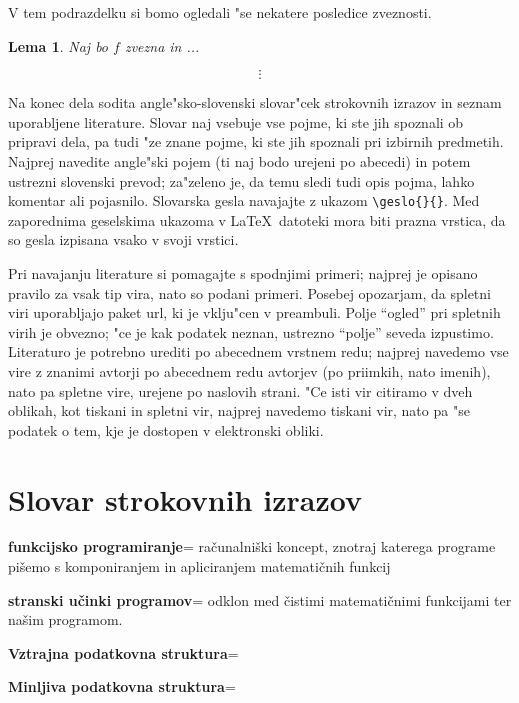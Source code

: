 \documentclass[12pt,a4paper]{amsart}
\theoremstyle{definition} %
\theoremstyle{plain} %
\newtheorem{lema}[definicija]{Lema}
\newcommand{\geslo}[2]{\noindent\textbf{#1}\hspace*{3mm}\hangindent=\parindent\hangafter=1 #2}
\begin{document}
V tem podrazdelku si bomo ogledali "se nekatere posledice zveznosti. 

\begin{lema}
Naj bo $f$ zvezna in ...
\end{lema}

$$\vdots$$

Na konec dela sodita angle"sko-slovenski slovar"cek strokovnih izrazov in seznam uporabljene literature. Slovar naj vsebuje vse pojme, ki ste jih spoznali ob pripravi dela, pa tudi "ze znane pojme, ki ste jih spoznali pri izbirnih predmetih. Najprej navedite angle"ski pojem (ti naj bodo urejeni po abecedi) in potem ustrezni slovenski prevod; za"zeleno je, da temu sledi tudi opis pojma, lahko komentar ali pojasnilo. Slovarska gesla navajajte z ukazom \verb|\geslo{}{}|. Med zaporednima geselskima ukazoma v \LaTeX\ datoteki mora biti prazna vrstica, da so gesla izpisana vsako v svoji vrstici.

Pri navajanju literature si pomagajte s spodnjimi primeri; najprej je opisano pravilo za vsak tip vira, nato so podani primeri. Posebej opozarjam, da spletni viri uporabljajo paket url, ki je vklju"cen v preambuli. Polje ``ogled'' pri spletnih virih je obvezno; "ce je kak podatek neznan, ustrezno ``polje'' seveda izpustimo. Literaturo je potrebno urediti po abecednem vrstnem redu; najprej navedemo vse vire z znanimi avtorji po abecednem redu avtorjev (po priimkih, nato imenih), nato pa spletne vire, urejene po naslovih strani. "Ce isti vir citiramo v dveh oblikah, kot tiskani in spletni vir, najprej navedemo tiskani vir, nato pa "se podatek o tem, kje je dostopen v elektronski obliki.

\section*{Slovar strokovnih izrazov}

\geslo{funkcijsko programiranje}{računalniški koncept, znotraj katerega programe pišemo s komponiranjem in apliciranjem matematičnih funkcij}

\geslo{stranski učinki programov}{odklon med čistimi matematičnimi funkcijami ter našim programom.}

\geslo{Vztrajna podatkovna struktura}{}

\geslo{Minljiva podatkovna struktura}{}
\end{document}
